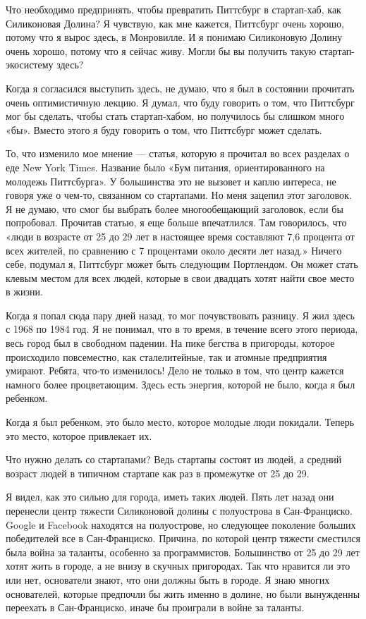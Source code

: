 \documentclass[ebook,12pt,oneside,openany]{memoir}
\author{Пол Грэм} \date{}
\begin{document}
\maketitle

Что необходимо предпринять, чтобы превратить Питтсбург в стартап-хаб,
как Силиконовая Долина? Я чувствую, как мне кажется, Питтсбург очень
хорошо, потому что я вырос здесь, в Монровилле. И я понимаю
Силиконовую Долину очень хорошо, потому что я сейчас живу. Могли бы вы
получить такую ​​стартап-экосистему здесь?

Когда я согласился выступить здесь, не думаю, что я был в состоянии
прочитать очень оптимистичную лекцию. Я думал, что буду говорить о
том, что Питтсбург мог бы сделать, чтобы стать стартап-хабом, но
получилось бы слишком много «бы». Вместо этого я буду говорить о том,
что Питтсбург может сделать.

То, что изменило мое мнение — статья, которую я прочитал во всех
разделах о еде New York Times. Название было «Бум питания,
ориентированного на молодежь Питтсбурга». У большинства это не вызовет
и каплю интереса, не говоря уже о чем-то, связанном со стартапами. Но
меня зацепил этот заголовок. Я не думаю, что смог бы выбрать более
многообещающий заголовок, если бы попробовал. Прочитав статью, я еще
больше впечатлился. Там говорилось, что «люди в возрасте от 25 до 29
лет в настоящее время составляют 7,6 процента от всех жителей, по
сравнению с 7 процентами около десяти лет назад.» Ничего себе, подумал
я, Питтсбург может быть следующим Портлендом. Он может стать клевым
местом для всех людей, которые в свои двадцать хотят найти свое место
в жизни.


Когда я попал сюда пару дней назад, то мог почувствовать разницу. Я
жил здесь с 1968 по 1984 год. Я не понимал, что в то время, в течение
всего этого периода, весь город был в свободном падении. На пике
бегства в пригороды, которое происходило повсеместно, как
сталелитейные, так и атомные предприятия умирают. Ребята, что-то
изменилось! Дело не только в том, что центр кажется намного более
процветающим. Здесь есть энергия, которой не было, когда я был
ребенком.

Когда я был ребенком, это было место, которое молодые люди покидали.
Теперь это место, которое привлекает их.

Что нужно делать со стартапами? Ведь стартапы состоят из людей, а
средний возраст людей в типичном стартапе как раз в промежутке от 25
до 29.

Я видел, как это сильно для города, иметь таких людей. Пять лет назад
они перенесли центр тяжести Силиконовой долины с полуострова в
Сан-Франциско. Google и Facebook находятся на полуострове, но
следующее поколение больших победителей все в Сан-Франциско. Причина,
по которой центр тяжести сместился была война за таланты, особенно за
программистов. Большинство от 25 до 29 лет хотят жить в городе, а не
внизу в скучных пригородах. Так что нравится ли это или нет,
основатели знают, что они должны быть в городе. Я знаю многих
основателей, которые предпочли бы жить именно в долине, но были
вынужденны переехать в Сан-Франциско, иначе бы проиграли в войне за
таланты.
\end{document}
